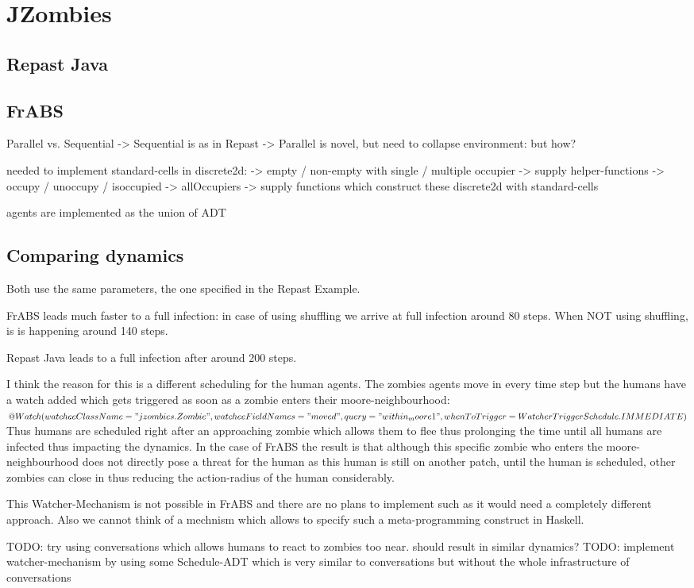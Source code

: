 \section{JZombies}

\subsection{Repast Java}

\subsection{FrABS}
Parallel vs. Sequential
	-> Sequential is as in Repast
	-> Parallel is novel, but need to collapse environment: but how?

needed to implement standard-cells in discrete2d:
	-> empty / non-empty with single / multiple occupier
	-> supply helper-functions
		-> occupy / unoccupy / isoccupied
		-> allOccupiers
	-> supply functions which construct these discrete2d with standard-cells

agents are implemented as the union of ADT

\subsection{Comparing dynamics}
Both use the same parameters, the one specified in the Repast Example.

FrABS leads much faster to a full infection: in case of using shuffling we arrive at full infection around 80 steps. When NOT using shuffling, is is happening around 140 steps.

Repast Java leads to a full infection after around 200 steps.

I think the reason for this is a different scheduling for the human agents. The zombies agents move in every time step but the humans have a watch added which gets triggered as soon as a zombie enters their moore-neighbourhood:
$
		@Watch(watcheeClassName = "jzombies.Zombie", 
			watcheeFieldNames = "moved",
			query = "within_moore 1", 
			whenToTrigger = WatcherTriggerSchedule.IMMEDIATE)$
Thus humans are scheduled right after an approaching zombie which allows them to flee thus prolonging the time until all humans are infected thus impacting the dynamics. In the case of FrABS the result is that although this specific zombie who enters the moore-neighbourhood does not directly pose a threat for the human as this human is still on another patch, until the human is scheduled, other zombies can close in thus reducing the action-radius of the human considerably.

This Watcher-Mechanism is not possible in FrABS and there are no plans to implement such as it would need a completely different approach. Also we cannot think of a mechnism which allows to specify such a meta-programming construct in Haskell.

TODO: try using conversations which allows humans to react to zombies too near. should result in similar dynamics?
TODO: implement watcher-mechanism by using some Schedule-ADT which is very similar to conversations but without the whole infrastructure of conversations
